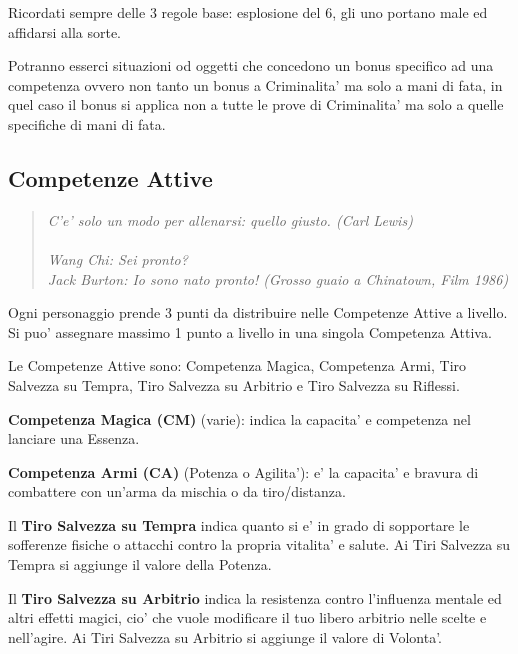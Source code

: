 \documentclass[a4paper,11pt,twoside,openany]{book}
\begin{document}
	Ricordati sempre delle 3 regole base: esplosione del 6, gli uno portano male ed affidarsi alla sorte.
	
	\bigskip
	
	Potranno esserci situazioni od oggetti che concedono un bonus specifico ad una competenza ovvero non tanto un bonus a Criminalita' ma solo a mani di fata, in quel caso il bonus si applica non a tutte le prove di Criminalita' ma solo a quelle specifiche di mani di fata.
	
	
	\subsection{Competenze Attive}
	
	\label{competenze-attive}
	\begin{quote}\textit{C'e' solo un modo per allenarsi: quello giusto. (Carl Lewis)\\\\
			Wang Chi: Sei pronto?\\
			Jack Burton: Io sono nato pronto! (Grosso guaio a Chinatown, Film 1986)
	}\end{quote}
	
	Ogni personaggio prende 3 punti da distribuire nelle Competenze Attive a livello. Si puo' assegnare massimo 1 punto a livello in una singola Competenza Attiva.
	
	Le Competenze Attive sono: Competenza Magica, Competenza Armi, Tiro Salvezza su Tempra, Tiro Salvezza su Arbitrio e Tiro Salvezza su Riflessi.
	
	\textbf{Competenza Magica (CM)} (varie): indica la capacita' e competenza nel lanciare una Essenza.
	
	\textbf{Competenza Armi (CA)} (Potenza o Agilita'): e' la capacita' e bravura di combattere con un'arma da mischia o da tiro/distanza.
	
	Il \textbf{Tiro Salvezza su Tempra} indica quanto si e' in grado di sopportare le sofferenze fisiche o attacchi contro la propria vitalita' e salute. Ai Tiri Salvezza su Tempra si aggiunge il valore della Potenza. 
	
	Il \textbf{Tiro Salvezza su Arbitrio} indica la resistenza contro l'influenza mentale ed altri effetti magici, cio' che vuole modificare il tuo libero arbitrio nelle scelte e nell'agire. Ai Tiri Salvezza su Arbitrio si aggiunge il valore di Volonta'.
	
\end{document}
